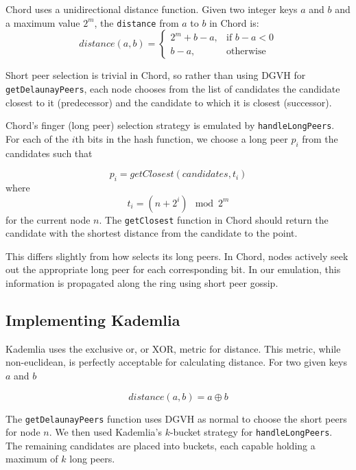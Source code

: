 Chord uses a unidirectional distance function.
Given two integer keys $ a $ and $ b $ and a maximum value $ 2^{m}$, the \texttt{distance} from $ a $ to $ b $ in Chord is: 
\[ distance(a,b) =
\begin{cases}
	2^m + b - a, & \text{if } b - a < 0 \\
	b-a, & \text{otherwise}
\end{cases}
  \]


Short peer selection is trivial in Chord, so rather than using DGVH for \texttt{getDelaunayPeers}, each node chooses from the list of candidates the candidate closest to it (predecessor) and the candidate to which it is closest (successor).

Chord's finger (long peer) selection strategy is emulated by \texttt{handleLongPeers}.
For each of the $i$th bits in the hash function, we choose a long peer $ p_i $ from the candidates such that 


\[ p_i =   getClosest\left(candidates, t_{i}\right)  \]
where
\[t_{i} =  (n + 2^{i}) \mod 2^m \]
for the current node $n$.
The \texttt{getClosest} function in Chord should return the candidate with the shortest distance from the candidate to the point.

This differs slightly from how selects its long peers.
In Chord, nodes actively seek out the appropriate long peer for each  corresponding bit.
In our emulation, this information is propagated along the ring using short peer gossip.




\subsection{Implementing Kademlia}
Kademlia uses the exclusive or, or XOR, metric for distance.
This metric, while non-euclidean, is perfectly acceptable for calculating distance.
For two given keys $ a $ and $ b $

\[ distance(a, b) = a  \oplus b\]

The \texttt{getDelaunayPeers} function uses DGVH as normal to choose the short peers for node $n$.
We then used Kademlia's $k$-bucket strategy \cite{kademlia} for \texttt{handleLongPeers}.
The remaining candidates are placed into buckets, each capable holding a maximum of $k$ long peers.

